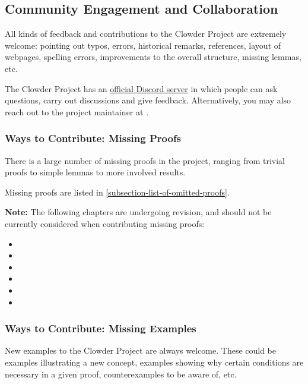 \subsection{Community Engagement and Collaboration}\label{subsection-community-engagement-and-collaboration}
All kinds of feedback and contributions to the Clowder Project are extremely welcome: pointing out typos, errors, historical remarks, references, layout of webpages, spelling errors, improvements to the overall structure, missing lemmas, etc.

The Clowder Project has an \href{https://discord.gg/b98uG2MWgc}{official Discord server} in which people can ask questions, carry out discussions and give feedback. Alternatively, you may also reach out to the project maintainer at \href{mailto:emily.de.oliveira.santos.tmf@gmail.com}{}.
\subsubsection{Ways to Contribute: Missing Proofs}\label{subsubsection-ways-to-contribute-missing-proofs}
There is a large number of missing proofs in the project, ranging from trivial proofs to simple lemmas to more involved results.

Missing proofs are listed in \cref{subsection-list-of-omitted-proofs}.

\textbf{Note: }The following chapters are undergoing revision, and should not be currently considered when contributing missing proofs:
\begin{itemize}
    \item \ChapterRelations
    \item \ChapterConstructionsWithRelations
    \item \ChapterConditionsOnRelations
    \item \ChapterCategories
    \item \ChapterConstructionsWithMonoidalCategories
    \item \ChapterTypesOfMorphismsInBicategories
\end{itemize}
\subsubsection{Ways to Contribute: Missing Examples}\label{subsubsection-ways-to-contribute-missing-examples}
New examples to the Clowder Project are always welcome. These could be examples illustrating a new concept, examples showing why certain conditions are necessary in a given proof, counterexamples to be aware of, etc.

